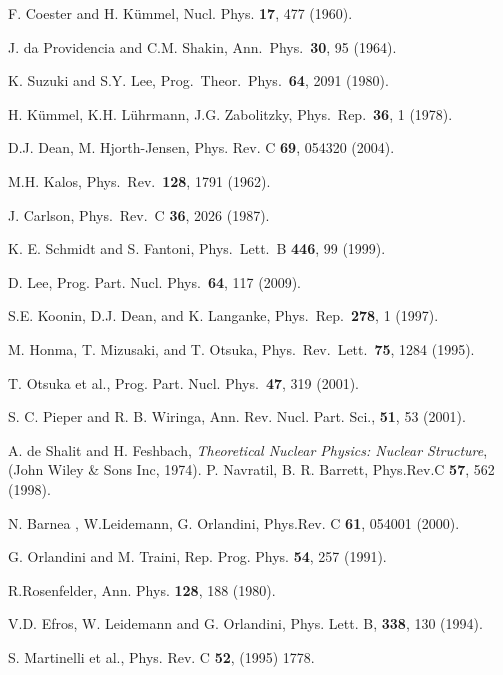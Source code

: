 \begin{thebibliography}{00}
 F. Coester and H. K{\"u}mmel, Nucl. Phys.  {\bf 17}, 477 (1960).

 J. da Providencia and C.M. Shakin, Ann.~Phys.~{\bf 30}, 95 (1964). 

 K. Suzuki and S.Y. Lee, Prog.~Theor.~Phys.~{\bf 64},  2091  (1980).

 H. K\"ummel, K.H. L\"uhrmann, J.G. Zabolitzky, Phys.~Rep.~{\bf 36}, 1 (1978). 

 D.J. Dean, M. Hjorth-Jensen, Phys. Rev. C  {\bf 69}, 054320 (2004). 

 M.H. Kalos,  Phys.~Rev.~{\bf 128},  1791 (1962). 

 J. Carlson,  Phys.~Rev.~C {\bf 36},  2026   (1987). 

 K. E. Schmidt and S. Fantoni,  Phys.~Lett.~B {\bf 446},  99  (1999). 

 D. Lee,   Prog. Part. Nucl. Phys.~{\bf 64}, 117 (2009).

 S.E. Koonin, D.J. Dean, and K. Langanke,  Phys.~Rep.~{\bf 278}, 1 (1997).

 M. Honma, T. Mizusaki, and T. Otsuka,  Phys.~Rev.~Lett.~{\bf 75}, 1284 (1995).

 T. Otsuka et al.,  Prog. Part. Nucl. Phys.~{\bf 47},  319 (2001).

 S. C. Pieper and R. B. Wiringa, Ann. Rev. Nucl. Part. Sci., {\bf 51}, 53 (2001).

 A. de Shalit and H. Feshbach, {\it Theoretical Nuclear Physics: Nuclear Structure}, 
               (John Wiley \& Sons Inc, 1974).                
 P. Navratil, B. R. Barrett, Phys.Rev.C {\bf 57}, 562 (1998). 

N. Barnea , W.Leidemann, G. Orlandini, Phys.Rev. C {\bf 61}, 054001 (2000).

 G. Orlandini and M. Traini, Rep. Prog. Phys. {\bf 54}, 257 (1991). 

 R.Rosenfelder, Ann. Phys. {\bf 128}, 188 (1980).

 V.D. Efros, W. Leidemann  and G. Orlandini, Phys. Lett. B, {\bf 338}, 130 (1994).

 S. Martinelli et al., Phys. Rev. C {\bf 52}, (1995) 1778.


\end{thebibliography}
